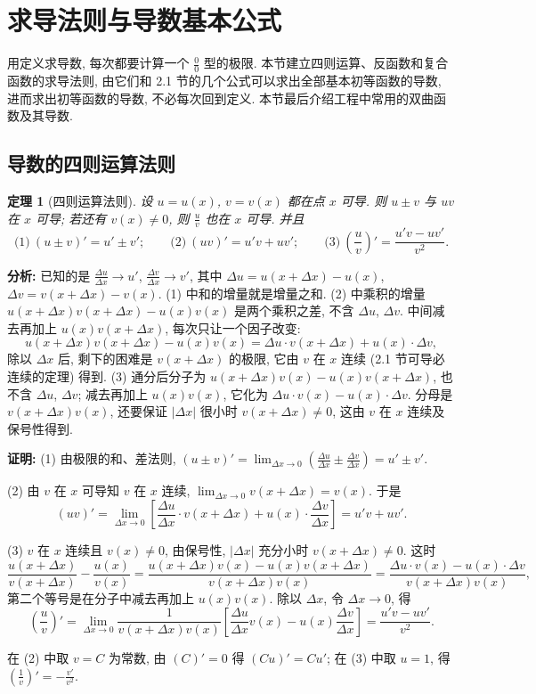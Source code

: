 \documentclass[UTF8,openany]{ctexbook}
\theoremstyle{chinesetextbook}
\newtheorem{theorem}{定理}[section]
\newenvironment{cnproof}{\par\indent\textbf{证明:} \ignorespaces}{\par}
\begin{document}
\section{求导法则与导数基本公式}
用定义求导数, 每次都要计算一个 $\displaystyle\frac00$ 型的极限. 本节建立四则运算、反函数和复合函数的求导法则, 由它们和 2.1 节的几个公式可以求出全部基本初等函数的导数, 进而求出初等函数的导数, 不必每次回到定义. 本节最后介绍工程中常用的双曲函数及其导数.
\subsection{导数的四则运算法则}
\begin{theorem}[四则运算法则]\label{thm:c2-2-arith}
设 $u=u(x)$, $v=v(x)$ 都在点 $x$ 可导. 则 $u\pm v$ 与 $uv$ 在 $x$ 可导; 若还有 $v(x)\ne0$, 则 $\displaystyle\frac uv$ 也在 $x$ 可导. 并且
\[
\text{(1)}\ (u\pm v)'=u'\pm v';\qquad\text{(2)}\ (uv)'=u'v+uv';\qquad\text{(3)}\ \left(\frac uv\right)'=\frac{u'v-uv'}{v^2}.
\]
\end{theorem}
\par\indent\textbf{分析:} 已知的是 $\displaystyle\frac{\Delta u}{\Delta x}\to u'$, $\displaystyle\frac{\Delta v}{\Delta x}\to v'$, 其中 $\Delta u=u(x+\Delta x)-u(x)$, $\Delta v=v(x+\Delta x)-v(x)$. (1) 中和的增量就是增量之和. (2) 中乘积的增量 $u(x+\Delta x)v(x+\Delta x)-u(x)v(x)$ 是两个乘积之差, 不含 $\Delta u$, $\Delta v$. 中间减去再加上 $u(x)v(x+\Delta x)$, 每次只让一个因子改变:
\[
u(x+\Delta x)v(x+\Delta x)-u(x)v(x)=\Delta u\cdot v(x+\Delta x)+u(x)\cdot\Delta v,
\]
除以 $\Delta x$ 后, 剩下的困难是 $v(x+\Delta x)$ 的极限, 它由 $v$ 在 $x$ 连续 (2.1 节可导必连续的定理) 得到. (3) 通分后分子为 $u(x+\Delta x)v(x)-u(x)v(x+\Delta x)$, 也不含 $\Delta u$, $\Delta v$; 减去再加上 $u(x)v(x)$, 它化为 $\Delta u\cdot v(x)-u(x)\cdot\Delta v$. 分母是 $v(x+\Delta x)v(x)$, 还要保证 $|\Delta x|$ 很小时 $v(x+\Delta x)\ne0$, 这由 $v$ 在 $x$ 连续及保号性得到.
\begin{cnproof}
(1) 由极限的和、差法则, $\displaystyle(u\pm v)'=\lim_{\Delta x\to0}\left(\frac{\Delta u}{\Delta x}\pm\frac{\Delta v}{\Delta x}\right)=u'\pm v'$.

(2) 由 $v$ 在 $x$ 可导知 $v$ 在 $x$ 连续, $\displaystyle\lim_{\Delta x\to0}v(x+\Delta x)=v(x)$. 于是
\[
(uv)'=\lim_{\Delta x\to0}\left[\frac{\Delta u}{\Delta x}\cdot v(x+\Delta x)+u(x)\cdot\frac{\Delta v}{\Delta x}\right]=u'v+uv'.
\]

(3) $v$ 在 $x$ 连续且 $v(x)\ne0$, 由保号性, $|\Delta x|$ 充分小时 $v(x+\Delta x)\ne0$. 这时
\[
\frac{u(x+\Delta x)}{v(x+\Delta x)}-\frac{u(x)}{v(x)}=\frac{u(x+\Delta x)v(x)-u(x)v(x+\Delta x)}{v(x+\Delta x)v(x)}=\frac{\Delta u\cdot v(x)-u(x)\cdot\Delta v}{v(x+\Delta x)v(x)},
\]
第二个等号是在分子中减去再加上 $u(x)v(x)$. 除以 $\Delta x$, 令 $\Delta x\to0$, 得
\[
\left(\frac uv\right)'=\lim_{\Delta x\to0}\frac1{v(x+\Delta x)v(x)}\left[\frac{\Delta u}{\Delta x}v(x)-u(x)\frac{\Delta v}{\Delta x}\right]=\frac{u'v-uv'}{v^2}.
\]
\end{cnproof}
在 (2) 中取 $v=C$ 为常数, 由 $(C)'=0$ 得 $(Cu)'=Cu'$; 在 (3) 中取 $u=1$, 得 $\displaystyle\left(\frac1v\right)'=-\frac{v'}{v^2}$.
\end{document}
